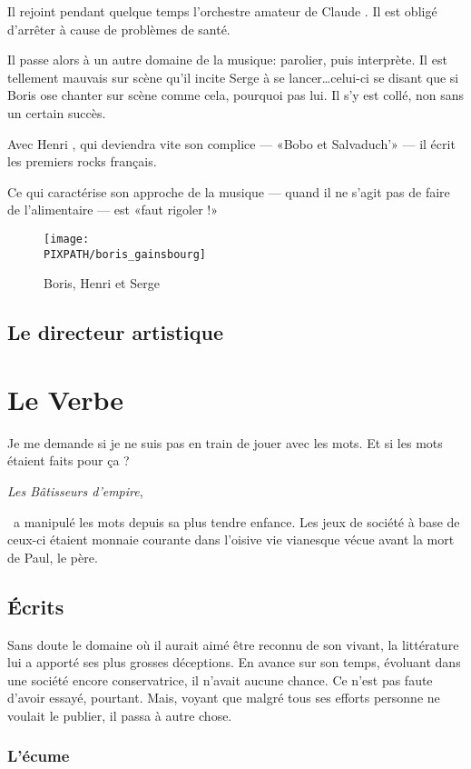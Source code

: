 Il rejoint pendant quelque temps l'orchestre amateur
de Claude . Il est obligé d'arrêter à cause
de problèmes de santé.

Il passe alors à un autre domaine de la musique: parolier, puis interprète. Il est tellement
mauvais sur scène qu'il incite Serge   à se lancer\ldots celui-ci se disant
que si Boris ose chanter sur scène comme cela, pourquoi pas lui. Il s'y est collé, non sans
un certain succès.

Avec Henri , qui deviendra vite son complice --- «Bobo et Salvaduch'» --- il
écrit les premiers rocks français.

Ce qui caractérise son approche de la musique --- quand il ne s'agit pas de faire de
l'alimentaire --- est «faut rigoler !»


\begin{figure}
\centering
\texttt{[image: \\PIXPATH/boris\_gainsbourg]}
\caption{Boris, Henri et Serge}
\end{figure}

\subsection{Le directeur artistique}

\section{Le Verbe}
\epigraph{Je me demande si je ne suis pas en train de jouer avec les mots. Et si les mots étaient faits pour ça ?}
{\emph{Les Bâtisseurs d'empire}, \BV}

\BV\ a manipulé les mots depuis sa plus tendre enfance. Les jeux de société à base
de ceux-ci étaient monnaie courante dans l'oisive vie vianesque vécue avant la mort
de Paul, le père.

\subsection{Écrits}

Sans doute le domaine où il aurait aimé être reconnu de son vivant, la littérature lui a apporté
ses plus grosses déceptions. En avance sur son temps, évoluant dans une société encore conservatrice,
il n'avait aucune chance. Ce n'est pas faute d'avoir essayé, pourtant. Mais, voyant que malgré tous
ses efforts personne ne voulait le publier, il passa à autre chose.

\subsubsection{L'écume}

